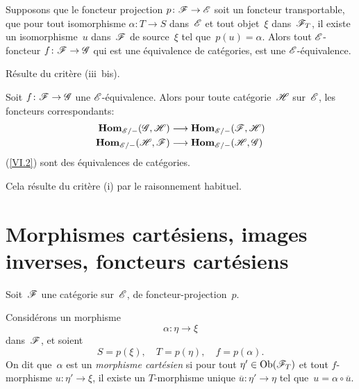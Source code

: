\begin{corollaire}
\label{VI.4.4} Supposons que le foncteur projection $p\colon
\cal{F}\to\cal{E}$ soit un foncteur transportable, \ie que pour tout
isomorphisme $\alpha\colon T \to S$ dans~$\cal{E}$ et tout objet~$\xi$
dans~$\cal{F}_T$, il existe un isomorphisme~$u$ dans~$\cal{F}$ de
source~$\xi$ tel que~$p(u)=\alpha$. Alors tout $\cal{E}$-foncteur
$f\colon \cal{F}\to\cal{G}$ qui est une \'equivalence de
cat\'egories, est une $\cal{E}$-\'equivalence.
\end{corollaire}

R\'esulte
du crit\`ere (iii~bis).

\begin{corollaire}
\label{VI.4.5} Soit $f\colon \cal{F}\to\cal{G}$ une
$\cal{E}$-\'equivalence. Alors pour toute cat\'egorie~$\cal{H}$
sur~$\cal{E}$, les foncteurs correspondants:
\begin{align*}
\SheafHom_{\cal{E}/-}(\cal{G},\cal{H}) & \to
\SheafHom_{\cal{E}/-}(\cal{F},\cal{H}) \\
\SheafHom_{\cal{E}/-}(\cal{H},\cal{F})
& \to \SheafHom_{\cal{E}/-}(\cal{H},\cal{G})
\end{align*}
(\cf \No \ref{VI.2}) sont des \'equivalences de cat\'egories.
\end{corollaire}

Cela r\'esulte du crit\`ere (i) par le raisonnement habituel.

\section{Morphismes cart\'esiens, images inverses, foncteurs
car\-t\'e\-siens}
\label{VI.5}

Soit~$\cal{F}$ une cat\'egorie sur~$\cal{E}$, de
foncteur-projection~$p$.
\enlargethispage{.5cm}

\begin{definition}
\label{VI.5.1} Consid\'erons un morphisme
$$
\alpha\colon \eta\to\xi
$$
dans~$\cal{F}$, et soient
$$
S = p(\xi), \quad T = p(\eta), \quad f=p(\alpha).
$$
On dit que~$\alpha$ est un \emph{morphisme cartésien}
si pour tout $\eta' \in \Ob(\cal{F}_T)$ et tout $f$-morphisme $u\colon
\eta'\to\xi$, il existe un $T$-morphisme unique $\overline{u}\colon
\eta'\to\eta$ tel que~$u=\alpha\circ\overline{u}$.
\end{definition}

